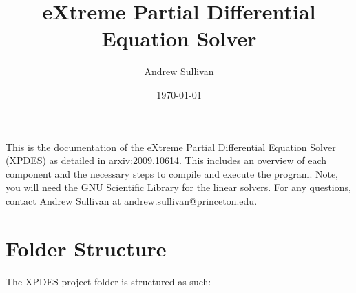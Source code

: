 \documentclass{article}
\begin{document}
\title{eXtreme Partial Differential Equation Solver}

\author{Andrew Sullivan}

\date{\today}

\maketitle


This is the documentation of the eXtreme Partial Differential Equation Solver (XPDES) as detailed
in arxiv:2009.10614. This includes an overview of each component and the necessary steps to compile and
execute the program. Note, you will need the GNU Scientific Library for the linear solvers. For any questions, contact Andrew Sullivan at andrew.sullivan@princeton.edu.

\section{Folder Structure}
\label{sec:folderstruct}

The XPDES project folder is structured as such:
\end{document}
